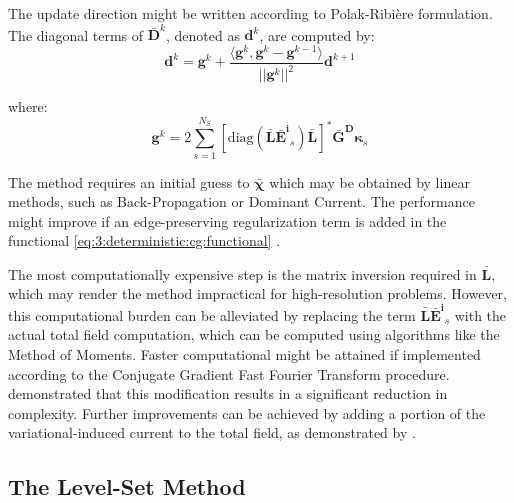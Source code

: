 			The update direction might be written according to Polak-Ribière formulation. The diagonal terms of $\mathbf{\bar{D}}^k$, denoted as $\mathbf{d}^k$, are computed by:
			\begin{equation}
				\mathbf{d}^k = \mathbf{g}^k + \frac{\langle \mathbf{g}^k, \mathbf{g}^k-\mathbf{g}^{k-1} \rangle}{||\mathbf{g}^k||^2}\mathbf{d}^{k+1}
			\end{equation}
			
			\noindent where:
			\begin{equation}
				\mathbf{g}^k = 2\sum\limits_{s=1}^{N_S} \left[ \mathrm{diag}(\mathbf{\bar{L}}\mathbf{\bar{E}^i}_s)\mathbf{\bar{L}} \right]^* \mathbf{\bar{G}^D} \boldsymbol{\kappa}_s
			\end{equation}
		
			The method requires an initial guess to $\boldsymbol{\bar{\chi}}$ which may be obtained by linear methods, such as Back-Propagation or Dominant Current. The performance might improve if an edge-preserving regularization term is added in the functional \eqref{eq:3:deterministic:cg:functional} \citep{lobel1997new}.
		
			The most computationally expensive step is the matrix inversion required in $\mathbf{\bar{L}}$, which may render the method impractical for high-resolution problems. However, this computational burden can be alleviated by replacing the term $\mathbf{\bar{L}}\mathbf{\bar{E}^i}_s$ with the actual total field computation, which can be computed using algorithms like the Method of Moments. Faster computational might be attained if implemented according to the Conjugate Gradient Fast Fourier Transform procedure. \cite{vargas2021computational} demonstrated that this modification results in a significant reduction in complexity. Further improvements can be achieved by adding a portion of the variational-induced current to the total field, as demonstrated by \cite{vargas2022subspace}.

		\subsection{The Level-Set Method}\label{chap:methods:deterministic:levelset}
			
